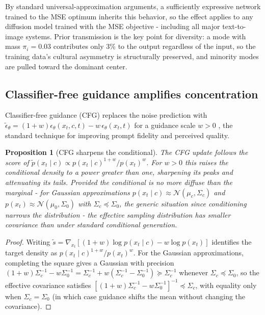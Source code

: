 \documentclass[11pt]{article}
\newtheorem{proposition}{Proposition}
\begin{document}
By standard universal-approximation arguments, a sufficiently expressive network trained to the MSE optimum inherits this behavior, so the effect applies to any diffusion model trained with the MSE objective - including all major text-to-image systems. Prior transmission is the key point for diversity: a mode with mass $\pi_i = 0.03$ contributes only 3\% to the output regardless of the input, so the training data's cultural asymmetry is structurally preserved, and minority modes are pulled toward the dominant center.

\subsection{Classifier-free guidance amplifies concentration}

Classifier-free guidance (CFG) replaces the noise prediction with $\tilde{\epsilon}_\theta = (1+w)\epsilon_\theta(x_t,c,t) - w\,\epsilon_\theta(x_t,t)$ for a guidance scale $w>0$ \citep{Ho2022, Dhariwal2021}, the standard technique for improving prompt fidelity and perceived quality.

\begin{proposition}[CFG sharpens the conditional]\label{prop:cfg}
The CFG update follows the score of $\tilde{p}(x_t\mid c) \propto p(x_t\mid c)^{1+w} / p(x_t)^{w}$. For $w>0$ this raises the conditional density to a power greater than one, sharpening its peaks and attenuating its tails. Provided the conditional is no more diffuse than the marginal - for Gaussian approximations $p(x_t \mid c) \approx \mathcal{N}(\mu_c, \Sigma_c)$ and $p(x_t) \approx \mathcal{N}(\mu_0, \Sigma_0)$ with $\Sigma_c \preceq \Sigma_0$, the generic situation since conditioning narrows the distribution - the effective sampling distribution has smaller covariance than under standard conditional generation.
\end{proposition}

\begin{proof}
Writing $\tilde{s} = \nabla_{x_t}[(1+w)\log p(x_t\mid c) - w\log p(x_t)]$ identifies the target density as $p(x_t\mid c)^{1+w}/p(x_t)^{w}$. For the Gaussian approximations, completing the square gives a Gaussian with precision $(1+w)\Sigma_c^{-1} - w\Sigma_0^{-1} = \Sigma_c^{-1} + w(\Sigma_c^{-1} - \Sigma_0^{-1}) \succeq \Sigma_c^{-1}$ whenever $\Sigma_c \preceq \Sigma_0$, so the effective covariance satisfies $[(1+w)\Sigma_c^{-1} - w\Sigma_0^{-1}]^{-1} \preceq \Sigma_c$, with equality only when $\Sigma_c = \Sigma_0$ (in which case guidance shifts the mean without changing the covariance).
\end{proof}
\end{document}
